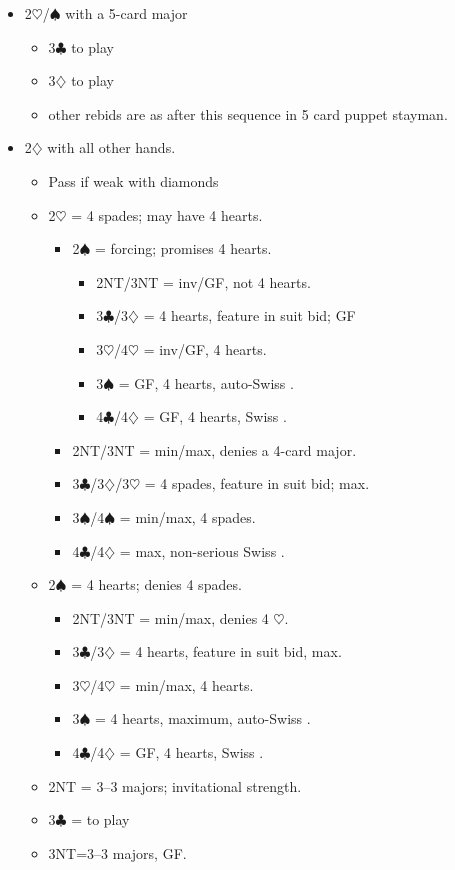 \documentclass[a4paper,14pt]{extarticle}
\begin{document}
	\begin{itemize}
	\item 2$\heartsuit$/$\spadesuit$ with a 5-card major
		\begin{itemize}
		\item 3$\clubsuit$ to play
		\item 3$\diamondsuit$ to play
		\item other rebids are as after this sequence in 5 card puppet stayman.
		\end{itemize}
\newpage
	\item 2$\diamondsuit$ with all other hands. 
		\begin{itemize}
		\item Pass if weak with diamonds
		\item 2$\heartsuit$ = 4 spades; may have 4 hearts.
			\begin{itemize}
			\item 2$\spadesuit$ = forcing; promises 4 hearts.
				\begin{itemize}
				\item 2NT/3NT = inv/GF, not 4 hearts.
				\item 3$\clubsuit$/3$\diamondsuit$ = 4 hearts, feature in suit bid; GF
				\item 3$\heartsuit$/4$\heartsuit$ = inv/GF, 4 hearts.
				\item 3$\spadesuit$ = GF, 4 hearts, auto-Swiss .
				\item 4$\clubsuit$/4$\diamondsuit$ = GF, 4 hearts, Swiss .
				\end{itemize}
			\item 2NT/3NT = min/max, denies a 4-card major.
			\item 3$\clubsuit$/3$\diamondsuit$/3$\heartsuit$ = 4 spades, feature in suit bid; max.
			\item 3$\spadesuit$/4$\spadesuit$ = min/max, 4 spades.
			\item 4$\clubsuit$/4$\diamondsuit$ = max, non-serious Swiss .
			\end{itemize}

		\item 2$\spadesuit$ = 4 hearts; denies 4 spades.
			\begin{itemize}
			\item 2NT/3NT = min/max, denies 4 $\heartsuit$.
			\item 3$\clubsuit$/3$\diamondsuit$ = 4 hearts, feature in suit bid, max.
			\item 3$\heartsuit$/4$\heartsuit$ = min/max, 4 hearts.
			\item 3$\spadesuit$ = 4 hearts, maximum, auto-Swiss .
			\item 4$\clubsuit$/4$\diamondsuit$ = GF, 4 hearts, Swiss .
			\end{itemize}

		\item 2NT = 3--3 majors; invitational strength.
		\item 3$\clubsuit$ = to play
		\item 3NT=3--3 majors, GF.
		\end{itemize}
	\end{itemize}
\end{document}
